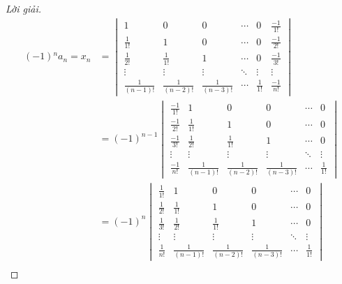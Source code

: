 \documentclass[class=linear-algebra,crop=false]{standalone}
\begin{document}
\begin{proof}[Lời giải]
	\begin{align*}
		(-1){}^{n}a_{n} = x_{n}   & =
		\begin{vmatrix}
			1                & 0                & 0                & \cdots & 0            & \frac{-1}{1!} \\
			\frac{1}{1!}     & 1                & 0                & \cdots & 0            & \frac{-1}{2!} \\
			\frac{1}{2!}     & \frac{1}{1!}     & 1                & \cdots & 0            & \frac{-1}{3!} \\
			\vdots           & \vdots           & \vdots           & \ddots & \vdots       & \vdots        \\
			\frac{1}{(n-1)!} & \frac{1}{(n-2)!} & \frac{1}{(n-3)!} & \cdots & \frac{1}{1!} & \frac{-1}{n!}
		\end{vmatrix} \\
		                          & = {(-1)}^{n-1}
		\begin{vmatrix}
			\frac{-1}{1!} & 1                & 0                & 0                & \cdots & 0            \\
			\frac{-1}{2!} & \frac{1}{1!}     & 1                & 0                & \cdots & 0            \\
			\frac{-1}{3!} & \frac{1}{2!}     & \frac{1}{1!}     & 1                & \cdots & 0            \\
			\vdots        & \vdots           & \vdots           & \vdots           & \ddots & \vdots       \\
			\frac{-1}{n!} & \frac{1}{(n-1)!} & \frac{1}{(n-2)!} & \frac{1}{(n-3)!} & \cdots & \frac{1}{1!}
		\end{vmatrix} \\
		                          & = {(-1)}^{n}
		\begin{vmatrix}
			\frac{1}{1!} & 1                & 0                & 0                & \cdots & 0            \\
			\frac{1}{2!} & \frac{1}{1!}     & 1                & 0                & \cdots & 0            \\
			\frac{1}{3!} & \frac{1}{2!}     & \frac{1}{1!}     & 1                & \cdots & 0            \\
			\vdots       & \vdots           & \vdots           & \vdots           & \ddots & \vdots       \\
			\frac{1}{n!} & \frac{1}{(n-1)!} & \frac{1}{(n-2)!} & \frac{1}{(n-3)!} & \cdots & \frac{1}{1!}
		\end{vmatrix}  \\

\end{align*}
\end{proof}
\end{document}
